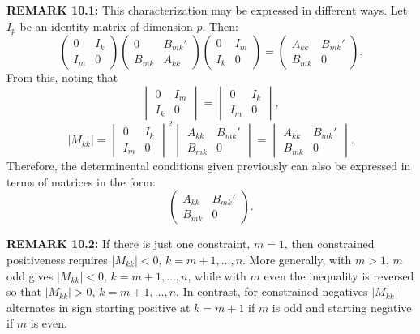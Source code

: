 \begin{original}
\textbf{REMARK 10.1:} This characterization may be expressed in different ways. Let $I_p$ be an identity matrix of dimension $p$. Then:
\[
\begin{pmatrix} 0 & I_k \\ I_m & 0 \end{pmatrix}
\begin{pmatrix} 0 & B_{mk}' \\ B_{mk} & A_{kk} \end{pmatrix}
\begin{pmatrix} 0 & I_m \\ I_k & 0 \end{pmatrix}
= \begin{pmatrix} A_{kk} & B_{mk}' \\ B_{mk} & 0 \end{pmatrix}.
\]
From this, noting that
\[
\begin{vmatrix} 0 & I_m \\ I_k & 0 \end{vmatrix} = \begin{vmatrix} 0 & I_k \\ I_m & 0 \end{vmatrix},
\]
\[
|M_{kk}| = \begin{vmatrix} 0 & I_k \\ I_m & 0 \end{vmatrix}^2
\begin{vmatrix} A_{kk} & B_{mk}' \\ B_{mk} & 0 \end{vmatrix}
= \begin{vmatrix} A_{kk} & B_{mk}' \\ B_{mk} & 0 \end{vmatrix}.
\]
Therefore, the determinental conditions given previously can also be expressed in terms of matrices in the form:
\[
\begin{pmatrix} A_{kk} & B_{mk}' \\ B_{mk} & 0 \end{pmatrix}.
\]

\textbf{REMARK 10.2:} If there is just one constraint, $m=1$, then constrained positiveness requires $|M_{kk}| < 0$, $k = m+1,\ldots,n$. More generally, with $m>1$, $m$ odd gives $|M_{kk}| < 0$, $k = m+1,\ldots,n$, while with $m$ even the inequality is reversed so that $|M_{kk}| > 0$, $k = m+1,\ldots,n$. In contrast, for constrained negatives $|M_{kk}|$ alternates in sign starting positive at $k = m+1$ if $m$ is odd and starting negative if $m$ is even.
\end{original}
